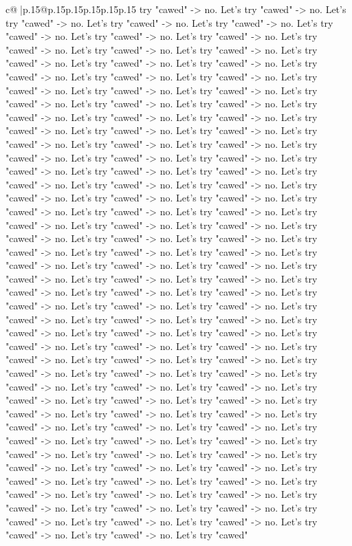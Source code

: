 \documentclass{article}
\begin{document}
{\begin{supertabular}{c@{$\;$}|p{.15\linewidth}@{}p{.15\linewidth}p{.15\linewidth}p{.15\linewidth}p{.15\linewidth}p{.15\linewidth}}
{{{try "cawed" {-}> no. Let's try "cawed" {-}> no. Let's try "cawed" {-}> no. Let's try "cawed" {-}> no. Let's try "cawed" {-}> no. Let's try "cawed" {-}> no. Let's try "cawed" {-}> no. Let's try "cawed" {-}> no. Let's try "cawed" {-}> no. Let's try "cawed" {-}> no. Let's try "cawed" {-}> no. Let's try "cawed" {-}> no. Let's try "cawed" {-}> no. Let's try "cawed" {-}> no. Let's try "cawed" {-}> no. Let's try "cawed" {-}> no. Let's try "cawed" {-}> no. Let's try "cawed" {-}> no. Let's try "cawed" {-}> no. Let's try "cawed" {-}> no. Let's try "cawed" {-}> no. Let's try "cawed" {-}> no. Let's try "cawed" {-}> no. Let's try "cawed" {-}> no. Let's try "cawed" {-}> no. Let's try "cawed" {-}> no. Let's try "cawed" {-}> no. Let's try "cawed" {-}> no. Let's try "cawed" {-}> no. Let's try "cawed" {-}> no. Let's try "cawed" {-}> no. Let's try "cawed" {-}> no. Let's try "cawed" {-}> no. Let's try "cawed" {-}> no. Let's try "cawed" {-}> no. Let's try "cawed" {-}> no. Let's try "cawed" {-}> no. Let's try "cawed" {-}> no. Let's try "cawed" {-}> no. Let's try "cawed" {-}> no. Let's try "cawed" {-}> no. Let's try "cawed" {-}> no. Let's try "cawed" {-}> no. Let's try "cawed" {-}> no. Let's try "cawed" {-}> no. Let's try "cawed" {-}> no. Let's try "cawed" {-}> no. Let's try "cawed" {-}> no. Let's try "cawed" {-}> no. Let's try "cawed" {-}> no. Let's try "cawed" {-}> no. Let's try "cawed" {-}> no. Let's try "cawed" {-}> no. Let's try "cawed" {-}> no. Let's try "cawed" {-}> no. Let's try "cawed" {-}> no. Let's try "cawed" {-}> no. Let's try "cawed" {-}> no. Let's try "cawed" {-}> no. Let's try "cawed" {-}> no. Let's try "cawed" {-}> no. Let's try "cawed" {-}> no. Let's try "cawed" {-}> no. Let's try "cawed" {-}> no. Let's try "cawed" {-}> no. Let's try "cawed" {-}> no. Let's try "cawed" {-}> no. Let's try "cawed" {-}> no. Let's try "cawed" {-}> no. Let's try "cawed" {-}> no. Let's try "cawed" {-}> no. Let's try "cawed" {-}> no. Let's try "cawed" {-}> no. Let's try "cawed" {-}> no. Let's try "cawed" {-}> no. Let's try "cawed" {-}> no. Let's try "cawed" {-}> no. Let's try "cawed" {-}> no. Let's try "cawed" {-}> no. Let's try "cawed" {-}> no. Let's try "cawed" {-}> no. Let's try "cawed" {-}> no. Let's try "cawed" {-}> no. Let's try "cawed" {-}> no. Let's try "cawed" {-}> no. Let's try "cawed" {-}> no. Let's try "cawed" {-}> no. Let's try "cawed" {-}> no. Let's try "cawed" {-}> no. Let's try "cawed" {-}> no. Let's try "cawed" {-}> no. Let's try "cawed" {-}> no. Let's try "cawed" {-}> no. Let's try "cawed" {-}> no. Let's try "cawed" {-}> no. Let's try "cawed" {-}> no. Let's try "cawed" {-}> no. Let's try "cawed" {-}> no. Let's try "cawed" {-}> no. Let's try "cawed" {-}> no. Let's try "cawed" {-}> no. Let's try "cawed" {-}> no. Let's try "cawed" {-}> no. Let's try "cawed" {-}> no. Let's try "cawed" {-}> no. Let's try "cawed" {-}> no. Let's try "cawed" {-}> no. Let's try "cawed" {-}> no. Let's try "cawed" {-}> no. Let's try "cawed" {-}> no. Let's try "cawed" {-}> no. Let's try "cawed" {-}> no. Let's try "cawed" {-}> no. Let's try "cawed" {-}> no. Let's try "cawed" {-}> no. Let's try "cawed" {-}> no. Let's try "cawed" {-}> no. Let's try "cawed" {-}> no. Let's try "cawed" }}}
\end{supertabular}}
\end{document}
